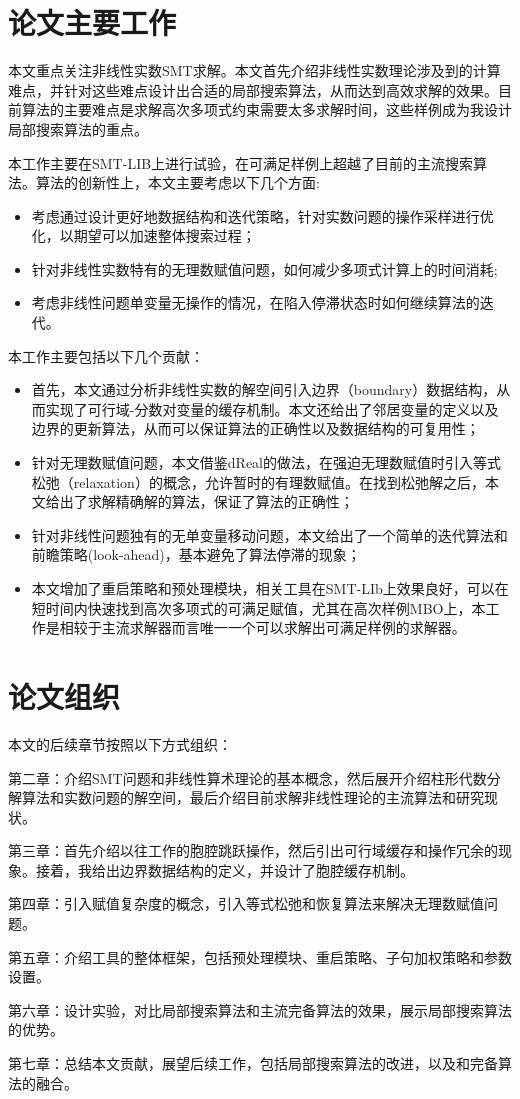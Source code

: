 \section{论文主要工作}
本文重点关注非线性实数SMT求解。本文首先介绍非线性实数理论涉及到的计算难点，并针对这些难点设计出合适的局部搜索算法，从而达到高效求解的效果。目前算法的主要难点是求解高次多项式约束需要太多求解时间，这些样例成为我设计局部搜索算法的重点。

本工作主要在SMT-LIB\cite{BarFT-SMTLIB}上进行试验，在可满足样例上超越了目前的主流搜索算法。算法的创新性上，本文主要考虑以下几个方面:
\begin{itemize}
    \item 考虑通过设计更好地数据结构和迭代策略，针对实数问题的操作采样进行优化，以期望可以加速整体搜索过程；
    \item 针对非线性实数特有的无理数赋值问题，如何减少多项式计算上的时间消耗;
    \item 考虑非线性问题单变量无操作的情况，在陷入停滞状态时如何继续算法的迭代。
\end{itemize}

本工作主要包括以下几个贡献：
\begin{itemize}
    \item 首先，本文通过分析非线性实数的解空间引入边界（boundary）数据结构，从而实现了可行域-分数对变量的缓存机制。本文还给出了邻居变量的定义以及边界的更新算法，从而可以保证算法的正确性以及数据结构的可复用性；
    \item 针对无理数赋值问题，本文借鉴dReal的做法，在强迫无理数赋值时引入等式松弛（relaxation）的概念，允许暂时的有理数赋值。在找到松弛解之后，本文给出了求解精确解的算法，保证了算法的正确性；
    \item 针对非线性问题独有的无单变量移动问题，本文给出了一个简单的迭代算法和前瞻策略(look-ahead)，基本避免了算法停滞的现象；
    \item 本文增加了重启策略和预处理模块，相关工具在SMT-LIb上效果良好，可以在短时间内快速找到高次多项式的可满足赋值，尤其在高次样例MBO上，本工作是相较于主流求解器而言唯一一个可以求解出可满足样例的求解器。
\end{itemize}

\section{论文组织}
本文的后续章节按照以下方式组织：

第二章：介绍SMT问题和非线性算术理论的基本概念，然后展开介绍柱形代数分解算法和实数问题的解空间，最后介绍目前求解非线性理论的主流算法和研究现状。

第三章：首先介绍以往工作的胞腔跳跃操作，然后引出可行域缓存和操作冗余的现象。接着，我给出边界数据结构的定义，并设计了胞腔缓存机制。

第四章：引入赋值复杂度的概念，引入等式松弛和恢复算法来解决无理数赋值问题。

第五章：介绍工具的整体框架，包括预处理模块、重启策略、子句加权策略和参数设置。

第六章：设计实验，对比局部搜索算法和主流完备算法的效果，展示局部搜索算法的优势。

第七章：总结本文贡献，展望后续工作，包括局部搜索算法的改进，以及和完备算法的融合。